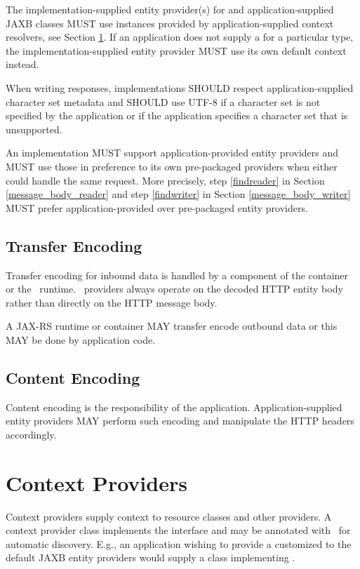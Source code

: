 The implementation-supplied entity provider(s) for  and application-supplied JAXB classes MUST use  instances provided by application-supplied context resolvers, see Section \ref{contextprovider}. If an application does not supply a  for a particular type, the implementation-supplied entity provider MUST use its own default context instead.

When writing responses, implementations SHOULD respect application-supplied character set metadata and SHOULD use UTF-8 if a character set is not specified by the application or if the application specifies a character set that is unsupported.

An implementation MUST support application-provided entity providers and MUST use those in preference to its own pre-packaged providers when either could handle the same request. More precisely, step \ref{findreader} in Section \ref{message_body_reader} and step \ref{findwriter} in Section \ref{message_body_writer} MUST prefer application-provided over pre-packaged entity providers.

\subsection{Transfer Encoding}
\label{transfer_encoding}

Transfer encoding for inbound data is handled by a component of the container or the \jaxrs\ runtime. \MsgRead\ providers always operate on the decoded HTTP entity body rather than directly on the HTTP message body.

A JAX-RS runtime or container MAY transfer encode outbound data or this MAY be done by application code.

\subsection{Content Encoding}

Content encoding is the responsibility of the application. Application-supplied entity providers MAY perform such encoding and manipulate the HTTP headers accordingly.

\section{Context Providers}
\label{contextprovider}

Context providers supply context to resource classes and other providers. A context provider class implements the  interface and may be annotated with \Provider\ for automatic discovery. E.g., an application wishing to provide a customized  to the default JAXB entity providers would supply a class implementing .


